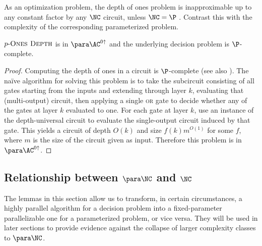As an optimization problem, the depth of ones problem is inapproximable up to any constant factor by any $\NC$ circuit, unless $\NC = \P$ \autocite{ks88}.
Contrast this with the complexity of the corresponding parameterized problem.

\begin{theorem}
  $p \textnormal{-} \textsc{Ones Depth}$ is in $\para \AC^{0 \uparrow}$ and the underlying decision problem is $\P$-complete.
\end{theorem}
\begin{proof}
  Computing the depth of ones in a circuit is $\P$-complete \autocite{ks88} (see also \autocite[Problem~A.1.10]{ghr95}).
  The naïve algorithm for solving this problem is to take the subcircuit consisting of all gates starting from the inputs and extending through layer $k$, evaluating that (multi-output) circuit, then applying a single \textsc{or} gate to decide whether any of the gates at layer $k$ evaluated to one.
  For each gate at layer $k$, use an instance of the depth-universal circuit to evaluate the single-output circuit induced by that gate.
  This yields a circuit of depth $O(k)$ and size $f(k) m^{O(1)}$ for some $f$, where $m$ is the size of the circuit given as input.
  Therefore this problem is in $\para \AC^{0\uparrow}$.
\end{proof}

\subsection{Relationship between \texorpdfstring{$\para \NC$}{paraNC} and \texorpdfstring{$\NC$}{NC}}

The lemmas in this section allow us to transform, in certain circumstances, a highly parallel algorithm for a decision problem into a fixed-parameter parallelizable one for a parameterized problem, or vice versa.
They will be used in later sections to provide evidence against the collapse of larger complexity classes to $\para \NC$.


